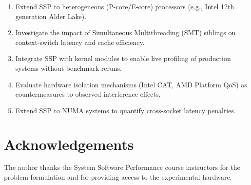 \documentclass[conference]{IEEEtran}
\begin{document}
\begin{enumerate}
  \item Extend SSP to heterogeneous (P-core/E-core) processors (e.g., Intel
        12th generation Alder Lake).
  \item Investigate the impact of Simultaneous Multithreading (SMT) siblings
        on context-switch latency and cache efficiency.
  \item Integrate SSP with kernel modules to enable live profiling of
        production systems without benchmark reruns.
  \item Evaluate hardware isolation mechanisms (Intel CAT, AMD Platform QoS)
        as countermeasures to observed interference effects.
  \item Extend SSP to NUMA systems to quantify cross-socket latency penalties.
\end{enumerate}

\section*{Acknowledgements}
The author thanks the System Software Performance course instructors for the
problem formulation and for providing access to the experimental hardware.
\end{document}
